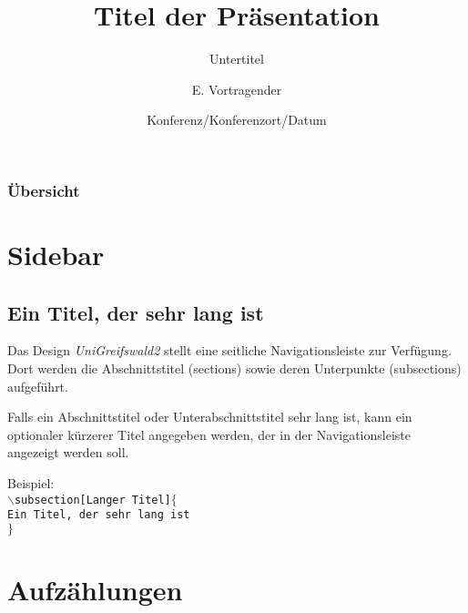 \documentclass{beamer}
\title{Titel der Präsentation}
\subtitle{Untertitel}
\author{E. Vortragender}
\institute[Uni Greifswald] %
{ 
	Institut für , \\
  	Ernst-Moritz-Arndt-Universität Greifswald
}
\date[Konf./Dat.] %
{Konferenz/Konferenzort/Datum}
\begin{document}
\begin{frame}
\maketitle
\end{frame}

\begin{frame}
\frametitle{Übersicht}
\tableofcontents
\end{frame}

\section{Sidebar}
\subsection[Langer Titel]{Ein Titel, der sehr lang ist}
\begin{frame}{\insertsection}{\insertsubsection}

Das Design {\em UniGreifswald2} stellt eine seitliche Navigationsleiste zur Verfügung.
Dort werden die Abschnittstitel (sections) sowie deren Unterpunkte (subsections) aufgeführt.

\bigskip 
Falls ein Abschnittstitel oder Unterabschnittstitel sehr lang ist, kann ein optionaler kürzerer Titel angegeben werden, 
der in der Navigationsleiste angezeigt werden soll.

Beispiel: \\[5pt]

$\backslash$\texttt{subsection[Langer Titel]$\{$\texttt \\ \qquad Ein Titel, der sehr lang ist}\\ 
$\}$

 
\end{frame}


\section{Aufzählungen}
\end{document}

